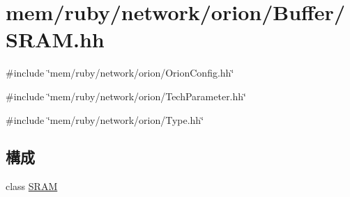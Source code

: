 \hypertarget{SRAM_8hh}{
\section{mem/ruby/network/orion/Buffer/SRAM.hh}
\label{SRAM_8hh}
}
{\ttfamily \#include \char`\"{}mem/ruby/network/orion/OrionConfig.hh\char`\"{}}\par
{\ttfamily \#include \char`\"{}mem/ruby/network/orion/TechParameter.hh\char`\"{}}\par
{\ttfamily \#include \char`\"{}mem/ruby/network/orion/Type.hh\char`\"{}}\par
\subsection*{構成}
\begin{DoxyCompactItemize}
\item 
class \hyperlink{classSRAM}{SRAM}
\end{DoxyCompactItemize}

